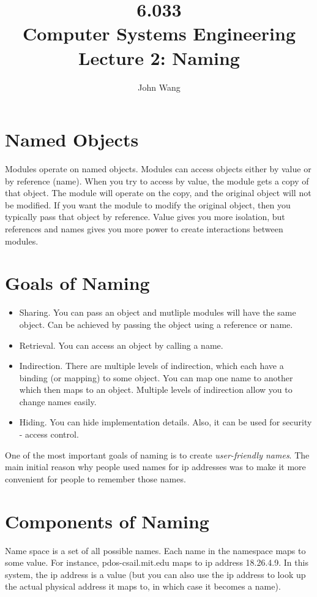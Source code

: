 \documentclass[psamsfonts]{amsart}
\title{6.033 \\
Computer Systems Engineering \\
Lecture 2: Naming}
\author{John Wang}
\begin{document}
\maketitle

\section{Named Objects}

Modules operate on named objects. Modules can access objects either by value or by reference (name). When you try to access by value, the module gets a copy of that object. The module will operate on the copy, and the original object will not be modified. If you want the module to modify the original object, then you typically pass that object by reference. Value gives you more isolation, but references and names gives you more power to create interactions between modules.

\section{Goals of Naming}

\begin{itemize}
\item Sharing. You can pass an object and mutliple modules will have the same object. Can be achieved by passing the object using a reference or name.
\item Retrieval. You can access an object by calling a name. 
\item Indirection. There are multiple levels of indirection, which each have a binding (or mapping) to some object. You can map one name to another which then maps to an object. Multiple levels of indirection allow you to change names easily. 
\item Hiding. You can hide implementation details. Also, it can be used for security - access control.
\end{itemize}

One of the most important goals of naming is to create \emph{user-friendly names}. The main initial reason why people used names for ip addresses was to make it more convenient for people to remember those names.

\section{Components of Naming}

Name space is a set of all possible names. Each name in the namespace maps to some value. For instance, pdos-csail.mit.edu maps to ip address 18.26.4.9. In this system, the ip address is a value (but you can also use the ip address to look up the actual physical address it maps to, in which case it becomes a name). 
\end{document}
